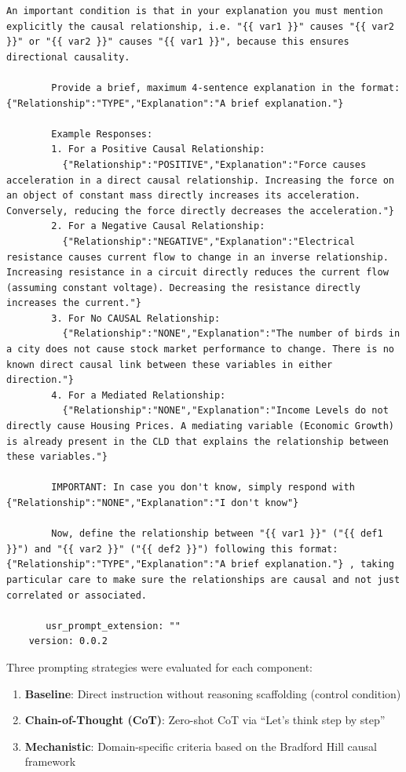 \begin{lstlisting}[caption={Generator Prompt Configuration: Nitai\_C (\texttt{generateNodes} + \texttt{generateEdges})},label={lst:generator_nitai_c_yaml}]
        An important condition is that in your explanation you must mention explicitly the causal relationship, i.e. "{{ var1 }}" causes "{{ var2 }}" or "{{ var2 }}" causes "{{ var1 }}", because this ensures directional causality.

        Provide a brief, maximum 4-sentence explanation in the format: {"Relationship":"TYPE","Explanation":"A brief explanation."}
        
        Example Responses:
        1. For a Positive Causal Relationship:
          {"Relationship":"POSITIVE","Explanation":"Force causes acceleration in a direct causal relationship. Increasing the force on an object of constant mass directly increases its acceleration. Conversely, reducing the force directly decreases the acceleration."}
        2. For a Negative Causal Relationship:
          {"Relationship":"NEGATIVE","Explanation":"Electrical resistance causes current flow to change in an inverse relationship. Increasing resistance in a circuit directly reduces the current flow (assuming constant voltage). Decreasing the resistance directly increases the current."}
        3. For No CAUSAL Relationship:
          {"Relationship":"NONE","Explanation":"The number of birds in a city does not cause stock market performance to change. There is no known direct causal link between these variables in either direction."}
        4. For a Mediated Relationship:
          {"Relationship":"NONE","Explanation":"Income Levels do not directly cause Housing Prices. A mediating variable (Economic Growth) is already present in the CLD that explains the relationship between these variables."}

        IMPORTANT: In case you don't know, simply respond with {"Relationship":"NONE","Explanation":"I don't know"}
        
        Now, define the relationship between "{{ var1 }}" ("{{ def1 }}") and "{{ var2 }}" ("{{ def2 }}") following this format: {"Relationship":"TYPE","Explanation":"A brief explanation."} , taking particular care to make sure the relationships are causal and not just correlated or associated.

       usr_prompt_extension: ""
    version: 0.0.2
\end{lstlisting}

Three prompting strategies were evaluated for each component:
\begin{enumerate}[noitemsep]
    \item \textbf{Baseline}: Direct instruction without reasoning scaffolding (control condition)
    \item \textbf{Chain-of-Thought (CoT)}: Zero-shot CoT via ``Let's think step by step''~\citep{kojima2022large}
    \item \textbf{Mechanistic}: Domain-specific criteria based on the Bradford Hill causal framework~\citep{shimonovich2020bradford}
\end{enumerate}

